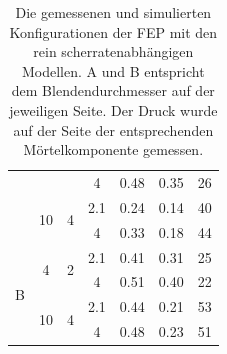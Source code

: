 \begin{table}[tb]
{\begin{tabular}{l c c c r r r}
                              &                     &                    & 4   & 0.48 & 0.35 &26\\
                              \addlinespace
                              & \multirow{2}{*}{10} & \multirow{2}{*}{4} & 2.1 & 0.24 & 0.14 &40\\
                              &                     &                    & 4   & 0.33 & 0.18 &44\\
     \cmidrule(lr){2-4}
     \cmidrule(lr){5-6}
     \cmidrule(lr){7-7}
    \multirow{4}{*}{\moertelB{} B} &  \multirow{2}{*}{4} & \multirow{2}{*}{2}  & 2.1 & 0.41 & 0.31 &25\\
                              &                     &                    & 4   & 0.51 & 0.40 &22\\
                              \addlinespace
                              & \multirow{2}{*}{10} & \multirow{2}{*}{4} & 2.1 & 0.44 & 0.21 &53\\
                              &                     &                    & 4   & 0.48 & 0.23 &51\\
    \bottomrule[1.5pt]
\end{tabular}}
    \caption{Die gemessenen und simulierten Konfigurationen der FEP mit den rein scherratenabhängigen Modellen. A und B entspricht dem Blendendurchmesser auf der jeweiligen Seite. Der Druck wurde auf der Seite der entsprechenden Mörtelkomponente gemessen.}
    \label{fig:fepVergleich}
\end{table}
%
